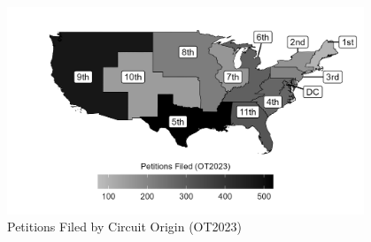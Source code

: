 \begin{landscape}
\vspace*{\fill}
\begin{figure}[H]
\centering
\caption{Petitions Filed by Circuit Origin (OT2023)}
\includegraphics[width = 0.95\textwidth]{"Figures/statpack_figures/circuit_court_map.png"}
\end{figure}
\vfill
\end{landscape}

